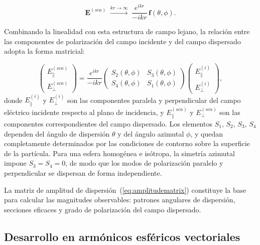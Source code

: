 \begin{equation}
\label{eq:Escat_farfield}
  \mathbf{E}^{(sca)} \;\xrightarrow{kr \to \infty}\;
  \frac{e^{ikr}}{-ikr}\,\mathbf{f}(\theta,\phi).
\end{equation}

Combinando la linealidad con esta estructura de campo lejano, la relación entre
las componentes de polarización del campo incidente y del campo dispersado
adopta la forma matricial:

\begin{equation}
\label{eq:amplitudematrix}
  \begin{pmatrix}
    E_{\parallel}^{(sca)} \\[4pt]
    E_{\perp}^{(sca)}
  \end{pmatrix}
  =
  \frac{e^{ikr}}{-ikr}
  \begin{pmatrix}
    S_{2}(\theta,\phi) & S_{3}(\theta,\phi) \\[4pt]
    S_{4}(\theta,\phi) & S_{1}(\theta,\phi)
  \end{pmatrix}
  \begin{pmatrix}
    E_{\parallel}^{(i)} \\[4pt]
    E_{\perp}^{(i)}
  \end{pmatrix},
\end{equation}
donde $E_{\parallel}^{(i)}$ y $E_{\perp}^{(i)}$ son las componentes paralela y
perpendicular del campo eléctrico incidente respecto al plano de incidencia, y
$E_{\parallel}^{(sca)}$ y $E_{\perp}^{(sca)}$ son las componentes correspondientes
del campo dispersado. Los elementos $S_1,\,S_2,\,S_3,\,S_4$ dependen del
ángulo de dispersión $\theta$ y del ángulo azimutal $\phi$, y quedan
completamente determinados por las condiciones de contorno sobre la superficie
de la partícula. Para una esfera homogénea e isótropa, la simetría azimutal
impone $S_3 = S_4 = 0$, de modo que los modos de polarización paralelo y
perpendicular se dispersan de forma independiente.

La matriz de amplitud de dispersión~(\ref{eq:amplitudematrix}) constituye la
base para calcular las magnitudes observables: patrones angulares de dispersión,
secciones eficaces y grado de polarización del campo dispersado.

\subsection{Desarrollo en armónicos esféricos vectoriales}

